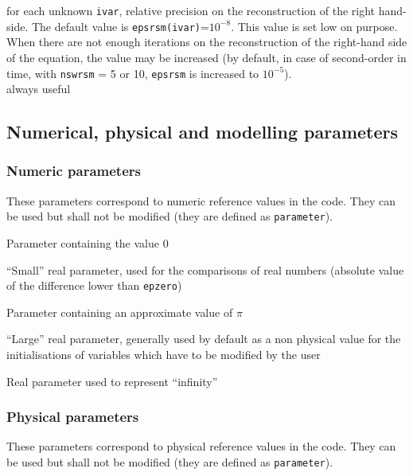 {for each unknown {\tt ivar}, relative precision on the reconstruction of the
right hand-side. The default value is {\tt epsrsm(ivar)}=$10^{-8}$. This value is set low
on purpose. When there are not enough iterations on the reconstruction of the
right-hand side of the equation,
the value may be increased (by default, in case of second-order in time,
with {\tt nswrsm} = 5 or 10, {\tt epsrsm} is increased to $10^{-5}$).\\
always useful}


\subsection{Numerical, physical and modelling parameters}
\subsubsection{Numeric parameters}

These parameters correspond to numeric reference values in the code.
They can be used but shall not be modified (they are defined as \texttt{parameter}).

{Parameter containing the value 0}

{``Small'' real parameter, used for the comparisons of real numbers (absolute
value of the difference lower than {\tt epzero})}

{Parameter containing an approximate value of $\pi$}

{``Large'' real parameter, generally used by default as a non physical value for
the initialisations of variables which have to be modified by the user}

{Real parameter used to represent ``infinity''}

\subsubsection{Physical parameters}
These parameters correspond to physical reference values in the code.
They can be used but shall not be modified (they are defined as {\tt parameter}).

